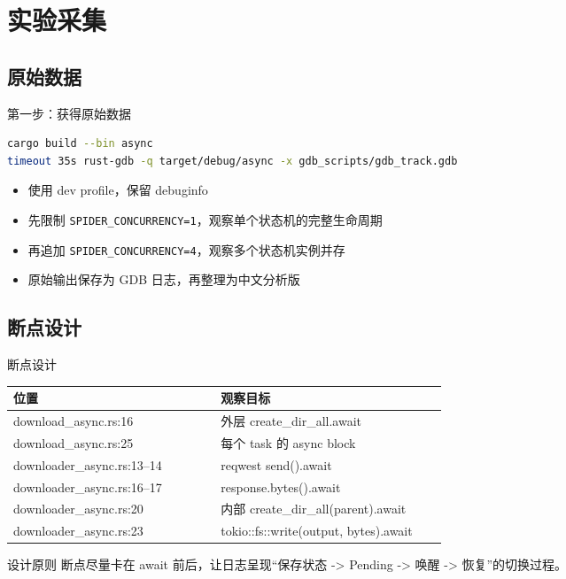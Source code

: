 \documentclass[aspectratio=169,11pt]{beamer}
\begin{document}
\section{实验采集}
\subsection{原始数据}

\begin{frame}[fragile]{第一步：获得原始数据}
  \begin{lstlisting}[language=bash]
cargo build --bin async
timeout 35s rust-gdb -q target/debug/async -x gdb_scripts/gdb_track.gdb
  \end{lstlisting}

  \begin{itemize}
    \item 使用 dev profile，保留 debuginfo
    \item 先限制 \texttt{SPIDER\_CONCURRENCY=1}，观察单个状态机的完整生命周期
    \item 再追加 \texttt{SPIDER\_CONCURRENCY=4}，观察多个状态机实例并存
    \item 原始输出保存为 GDB 日志，再整理为中文分析版
  \end{itemize}
\end{frame}

\subsection{断点设计}

\begin{frame}{断点设计}
  \begin{tabular}{>{\ttfamily}p{0.43\linewidth}p{0.47\linewidth}}
    \toprule
    位置 & 观察目标 \\
    \midrule
    download\_async.rs:16 & 外层 create\_dir\_all.await \\
    download\_async.rs:25 & 每个 task 的 async block \\
    downloader\_async.rs:13--14 & reqwest send().await \\
    downloader\_async.rs:16--17 & response.bytes().await \\
    downloader\_async.rs:20 & 内部 create\_dir\_all(parent).await \\
    downloader\_async.rs:23 & tokio::fs::write(output, bytes).await \\
    \bottomrule
  \end{tabular}

  \vspace{0.8em}
  \begin{block}{设计原则}
    断点尽量卡在 await 前后，让日志呈现“保存状态 -> Pending -> 唤醒 -> 恢复”的切换过程。
  \end{block}
\end{frame}
\end{document}
